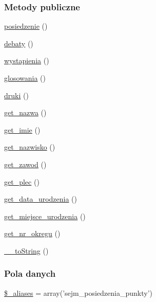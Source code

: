 \subsubsection*{Metody publiczne}
\begin{DoxyCompactItemize}
\item 
\hyperlink{classep___sejm___posiedzenie___punkt_abfdc29f0533665ad6c77341c5fa3f7c7}{posiedzenie} ()
\item 
\hyperlink{classep___sejm___posiedzenie___punkt_a61f284b69abf1b9994fb0531fd5072ec}{debaty} ()
\item 
\hyperlink{classep___sejm___posiedzenie___punkt_a18b1bf1c04262c23e5edc5c81a4f897c}{wystapienia} ()
\item 
\hyperlink{classep___sejm___posiedzenie___punkt_a053e53f5c6126e89ed49774ba8f12ec9}{glosowania} ()
\item 
\hyperlink{classep___sejm___posiedzenie___punkt_af22894fe8830155fc20716e34f1f1c33}{druki} ()
\item 
\hyperlink{classep___sejm___posiedzenie___punkt_ac0818f0049d7b84f08f77128f54cee36}{get\-\_\-nazwa} ()
\item 
\hyperlink{classep___sejm___posiedzenie___punkt_ac4b0c85dc2a130038f2d118dbd0c3d77}{get\-\_\-imie} ()
\item 
\hyperlink{classep___sejm___posiedzenie___punkt_abdd1d7ff92508da7f748ba1feec97af0}{get\-\_\-nazwisko} ()
\item 
\hyperlink{classep___sejm___posiedzenie___punkt_af80ca8310b60004454dd02a387deaa2c}{get\-\_\-zawod} ()
\item 
\hyperlink{classep___sejm___posiedzenie___punkt_ac7f9af5c3fa024e4c26a7b6bd4ce4bb4}{get\-\_\-plec} ()
\item 
\hyperlink{classep___sejm___posiedzenie___punkt_a880b240cd2d8c336fd1709bf0cb1ae2c}{get\-\_\-data\-\_\-urodzenia} ()
\item 
\hyperlink{classep___sejm___posiedzenie___punkt_ac57c08ec5e394a19c5bd9280c8376182}{get\-\_\-miejsce\-\_\-urodzenia} ()
\item 
\hyperlink{classep___sejm___posiedzenie___punkt_a2645a9f0aa5b0ccc482943348c033d0a}{get\-\_\-nr\-\_\-okregu} ()
\item 
\hyperlink{classep___sejm___posiedzenie___punkt_a7516ca30af0db3cdbf9a7739b48ce91d}{\-\_\-\-\_\-to\-String} ()
\end{DoxyCompactItemize}
\subsubsection*{Pola danych}
\begin{DoxyCompactItemize}
\item 
\hyperlink{classep___sejm___posiedzenie___punkt_ab4e31d75f0bc5d512456911e5d01366b}{\$\-\_\-aliases} = array('sejm\-\_\-posiedzenia\-\_\-punkty')
\end{DoxyCompactItemize}
